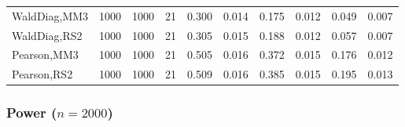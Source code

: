 \documentclass[
]{article}
\begin{document}
\begin{table}[H]
{\begin{tabular}[t]{lrrrrrrlrr}
\hspace{1em}WaldDiag,MM3 & 1000 & 1000 & 21 & 0.300 & 0.014 & 0.175 & 0.012 & 0.049 & 0.007\\
\hspace{1em}WaldDiag,RS2 & 1000 & 1000 & 21 & 0.305 & 0.015 & 0.188 & 0.012 & 0.057 & 0.007\\
\hspace{1em}Pearson,MM3 & 1000 & 1000 & 21 & 0.505 & 0.016 & 0.372 & 0.015 & 0.176 & 0.012\\
\hspace{1em}Pearson,RS2 & 1000 & 1000 & 21 & 0.509 & 0.016 & 0.385 & 0.015 & 0.195 & 0.013\\
\bottomrule
\end{tabular}}
\endgroup{}
\end{table}

\hypertarget{power-n2000-2}{%
\subsubsection{\texorpdfstring{Power
(\(n=2000\))}{Power (n=2000)}}\label{power-n2000-2}}
\end{document}
